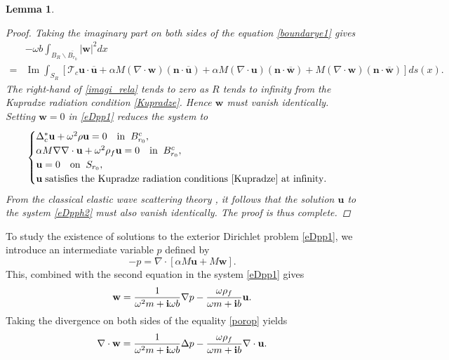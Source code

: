\documentclass[11pt]{article}
\newcommand{\no}{\nonumber}
\newcommand{\ba}{\backslash}
\newcommand{\ov}{\overline}
\newcommand{\bs}{\boldsymbol}
\newtheorem{lemma}[theorem]{Lemma}
\providecommand{\Ip}{\operatorname{Im}}%
\begin{document}
\begin{lemma}
\begin{proof}
Taking the imaginary part on both sides of the equation \eqref{boundarye1} gives
\begin{align}\label{imagi_rela}
&-\omega b \int _{B_{R}\ba\ov{B_{r_0}}}|\mathbf{w}|^2dx\\\no
=&\Ip \int_{S_R}\left[\mathcal{T}_c\mathbf{u}\cdot\overline{\mathbf{u}} +\alpha M( \nabla \cdot
\mathbf{w})(\bs{n}\cdot \overline{\mathbf{u}})+\alpha M(\nabla \cdot  \mathbf{u})(\bs{n} \cdot
\overline{\mathbf{w}})+M( \nabla \cdot  \mathbf{w})(\bs{n}\cdot \overline{\mathbf{w}})\right]ds(x).  
\end{align}
The right-hand of \eqref{imagi_rela} tends to zero as $R$ tends to infinity from the Kupradze 
radiation condition \eqref{Kupradze}. Hence $\mathbf{w}$ must vanish identically. Setting 
$\mathbf{w}=0$ in \eqref{eDpp1} reduces the system to
\begin{equation}\label{eDpph2}
\begin{cases}
\Delta_c^*\mathbf{u}+\omega^2\rho\mathbf{u}=0\quad {\rm in}\;\;B_{r_0}^c,\\
\alpha M\nabla \nabla \cdot \mathbf{u}+\omega^2\rho_f \mathbf{u}=0\quad {\rm in}\;\;B_{r_0}^c,\\
\mathbf{u}=0\quad {\rm on} \;\;S_{r_0},\\
\mathbf{u}\;\text{satisfies the Kupradze radiation conditions \eqref{Kupradze} at infinity}.
\end{cases}
\end{equation}
From the classical elastic wave scattering theory \cite{BP2008}, it follows that the solution 
$\mathbf{u}$ to the system \eqref{eDpph2} must also vanish identically. The proof is thus complete.
\end{proof}	
\end{lemma}
To study the existence of solutions to the exterior Dirichlet problem \eqref{eDpp1}, we introduce 
an intermediate variable $p$ defined by
\begin{equation}\label{p_variable}
-p=\nabla\cdot[\alpha M \mathbf{u}+M \mathbf{w}].
\end{equation}
This, combined with the second equation in the system \eqref{eDpp1} gives
\begin{equation}\label{porop}
\mathbf{w}=\frac{1}{\omega^2m+{\bf{i}}\omega b}\nabla p -\frac{\omega\rho_f}{{\omega m+\bf{i}}b}\mathbf{u}.
\end{equation}
Taking the divergence on both sides of the equality \eqref{porop} yields
\begin{equation}\label{divporop}
\nabla\cdot \mathbf{w}=\frac{1}{\omega^2m+{\bf{i}}\omega b}\Delta p -\frac{\omega\rho_f}{{\omega m
+\bf{i}}b}\nabla \cdot \mathbf{u}.	
\end{equation}  
\end{document}
